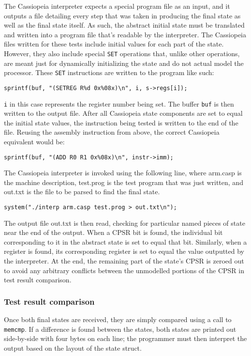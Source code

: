 \documentclass[letterpaper,12pt]{article}
\begin{document}
The Cassiopeia interpreter expects a special program file as an input, and it outputs a file detailing every step that was taken in producing the final state as well as the final state itself. As such, the abstract initial state must be translated and written into a program file that's readable by the interpreter. The Cassiopeia files written for these tests include initial values for each part of the state. However, they also include special \texttt{SET} operations that, unlike other operations, are meant just for dynamically initializing the state and do not actual model the processor. These \texttt{SET} instructions are written to the program like such:

\texttt{sprintf(buf, "(SETREG R\%d 0x\%08x)\textbackslash n", i, s->regs[i]);}

\texttt{i} in this case represents the register number being set. The buffer \texttt{buf} is then written to the output file. After all Cassiopeia state components are set to equal the initial state values, the instruction being tested is written to the end of the file. Reusing the assembly instruction from above, the correct Cassiopeia equivalent would be:

\texttt{sprintf(buf, "(ADD R0 R1 0x\%08x)\textbackslash n", instr->imm);}

The Cassiopeia interpreter is invoked using the following line, where arm.casp is the machine description, test.prog is the test program that was just written, and out.txt is the file to be parsed to find the final state.

\texttt{system("./interp arm.casp test.prog > out.txt\textbackslash n");}

The output file out.txt is then read, checking for particular named pieces of state near the end of the output. When a CPSR bit is found, the individual bit corresponding to it in the abstract state is set to equal that bit. Similarly, when a register is found, its corresponding register is set to equal the value outputted by the interpreter. At the end, the remaining part of the state's CPSR is zeroed out to avoid any arbitrary conflicts between the unmodelled portions of the CPSR in test result comparison.

\subsubsection{Test result comparison}

Once both final states are received, they are simply compared using a call to \texttt{memcmp}. If a difference is found between the states, both states are printed out side-by-side with four bytes on each line; the programmer must then interpret the output based on the layout of the state struct.
\end{document}
